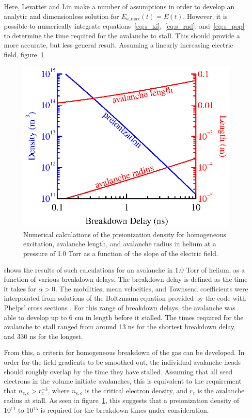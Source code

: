 Here, Levatter and Lin make a number of assumptions in order to develop an
analytic and dimensionless solution for $E_{a,\mathrm{max}}(t) = E(t)$. However,
it is possible to numerically integrate equations~\ref{eq:s_xi},~\ref{eq:s_rad},
and~\ref{eq:s_pop} to determine the time required for the avalanche to stall.
This should provide a more accurate, but less general result. Assuming a
linearly increasing electric field, figure~\ref{fig:he_avalanche}
\begin{figure}
  \centering
  \includegraphics{./chapters/theory/figures/he_avalanche.eps}
  \caption{Numerical calculations of the preionization density for homogeneous
    excitation, avalanche length, and avalanche radius in helium at a pressure
    of 1.0 Torr as a function of the slope of the electric field.}
  \label{fig:he_avalanche}
\end{figure}
shows the results of such calculations for an avalanche in 1.0 Torr of helium,
as a function of various breakdown delays. The breakdown delay is defined as the
time it takes for $\alpha > 0$. The mobilities, mean velocities, and Townsend
coefficients were interpolated from solutions of the Boltzmann equation provided
by the  code with Phelps' cross sections \cite{Phelps2002}. For
this range of breakdown delays, the avalanche was able to develop up to 6 cm in
length before it stalled. The times required for the avalanche to stall ranged
from around 13 ns for the shortest breakdown delay, and 330 ns for the longest.

From this, a criteria for homogeneous breakdown of the gas can be developed. In
order for the field gradients to be smoothed out, the individual avalanche heads
should roughly overlap by the time they have stalled. Assuming that all seed
electrons in the volume initiate avalanches, this is equivalent to the
requirement that $n_{e,c} > r_c^{-3}$, where $n_{e,c}$ is the critical electron
density, and $r_c$ is the avalanche radius at stall. As seen in
figure~\ref{fig:he_avalanche}, this suggests that a preionization density of
10$^{11}$ to 10$^{15}$ is required for the breakdown times under consideration.

